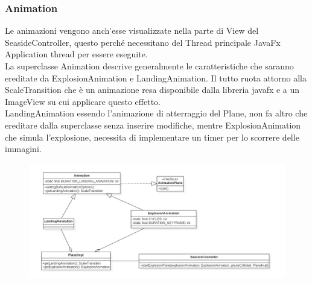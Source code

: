 \documentclass[a4paper,12pt]{report}
\begin{document}
\subsubsection{Animation}
Le animazioni vengono anch’esse visualizzate nella parte di View del SeasideController, questo perché necessitano del Thread principale 
JavaFx Application thread per essere eseguite.
\\
La superclasse Animation descrive generalmente le caratteristiche che saranno ereditate da ExplosionAnimation e LandingAnimation.
Il tutto ruota attorno alla ScaleTransition che è un animazione resa disponibile dalla libreria javafx e a un ImageView su cui applicare 
questo effetto.
\\
LandingAnimation essendo l’animazione di atterraggio del Plane, non fa altro che ereditare dalla superclasse senza inserire modifiche, 
mentre ExplosionAnimation che simula l’explosione, necessita di implementare un timer per lo scorrere delle immagini.
\begin{figure}[H]
    \begin{center}
        \centering
        \includegraphics[width=\textwidth]{img/Design/Rodilosso/Explosion.png}
    \end{center}
    \label{img:explosion}
\end{figure}
\end{document}
